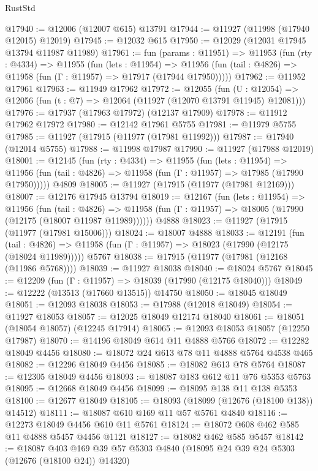 \begin{lexlean}{RustStd}
\begin{coremodule}
@17940 := @12006 (@12007 @615) @13791
@17944 := @11927 (@11998 (@17940 @12015) @12019)
@17945 := @12032 @615
@17950 := @12029 (@12031 @17945 @13794 @11987 @11989)
@17961 := fun (params : @11951) =>
  @11953
    (fun (rty : @4334) =>
    @11955
      (fun (lets : @11954) =>
      @11956 (fun (tail : @4826) => @11958 (fun (Γ : @11957) => @17917 (@17944 @17950)))))
@17962 := @11952 @17961
@17963 := @11949 @17962
@17972 := @12055
    (fun (U : @12054) => @12056 (fun (t : @7) => @12064 (@11927 (@12070 @13791 @11945) @12081)))
@17976 := @17937 (@17963 @17972) (@12137 @17909)
@17978 := @11912 @17962 @17972
@17980 := @12142 @17961 @5755
@17981 := @11979 @5755
@17985 := @11927 (@17915 (@11977 (@17981 @11992)))
@17987 := @17940 (@12014 @5755)
@17988 := @11998 @17987
@17990 := @11927 (@17988 @12019)
@18001 := @12145
    (fun (rty : @4334) =>
    @11955
      (fun (lets : @11954) =>
      @11956 (fun (tail : @4826) => @11958 (fun (Γ : @11957) => @17985 (@17990 @17950)))))
    @4809
@18005 := @11927 (@17915 (@11977 (@17981 @12169)))
@18007 := @12176 @17945 @13794
@18019 := @12167
    (fun (lets : @11954) =>
    @11956
      (fun (tail : @4826) =>
      @11958 (fun (Γ : @11957) => @18005 (@17990 (@12175 (@18007 @11987 @11989))))))
    @4888
@18023 := @11927 (@17915 (@11977 (@17981 @15006)))
@18024 := @18007 @4888
@18033 := @12191
    (fun (tail : @4826) => @11958 (fun (Γ : @11957) => @18023 (@17990 (@12175 (@18024 @11989)))))
    @5767
@18038 := @17915 (@11977 (@17981 (@12168 (@11986 @5768))))
@18039 := @11927 @18038
@18040 := @18024 @5767
@18045 := @12209 (fun (Γ : @11957) => @18039 (@17990 (@12175 @18040)))
@18049 := @12222 (@13513 (@17660 @13515)) @14750
@18050 := @18045 @18049
@18051 := @12093 @18038
@18053 := @17988 (@12018 @18049)
@18054 := @11927 @18053
@18057 := @12025 @18049 @12174 @18040
@18061 := @18051 (@18054 @18057) (@12245 @17914)
@18065 := @12093 @18053 @18057 (@12250 @17987)
@18070 := @14196 @18049 @614 @11 @4888 @5766
@18072 := @12282 @18049 @4456
@18080 := @18072 @24 @613 @78 @11 @4888 @5764 @4538 @465
@18082 := @12296 @18049 @4456
@18085 := @18082 @613 @78 @5764
@18087 := @12305 @18049 @4456
@18093 := @18087 @183 @612 @11 @76 @5353 @5763
@18095 := @12668 @18049 @4456
@18099 := @18095 @138 @11 @138 @5353
@18100 := @12677 @18049
@18105 := @18093 (@18099 (@12676 (@18100 @138)) @14512)
@18111 := @18087 @610 @169 @11 @57 @5761 @4840
@18116 := @12273 @18049 @4456 @610 @11 @5761
@18124 := @18072 @608 @462 @585 @11 @4888 @5457 @4456 @1121
@18127 := @18082 @462 @585 @5457
@18142 := @18087
    @403
    @169
    @39
    @57
    @5303
    @4840
    (@18095 @24 @39 @24 @5303 (@12676 (@18100 @24)) @14320)

\end{coremodule}
\end{lexlean}
